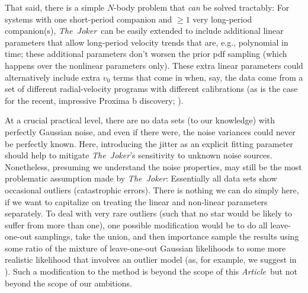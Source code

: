 \documentclass[manuscript, letterpaper]{aastex6}
\newcommand{\project}[1]{\textsl{#1}}
\newcommand{\samplername}{\project{The~Joker}}
\newcommand{\documentname}{\textsl{Article}}
\newcommand{\sectionname}{Section}
\newcommand{\resp}[1]{{\color{mahogany}#1}}
\begin{document}
That said, there is a simple $N$-body problem that \emph{can} be solved
tractably:
For systems with one short-period companion and $\geq1$ very long-period
companion(s), \samplername\ can be easily extended to include additional linear
parameters that allow long-period velocity trends that are, e.g., polynomial in
time; these additional parameters don't worsen the prior pdf sampling (which
happens over the nonlinear parameters only).
These extra linear parameters could alternatively include extra $v_0$ terms that
come in when, say, the data come from a set of different radial-velocity
programs with different calibrations (as is the case for the recent, impressive
Proxima b discovery; \citealt{Anglada-Escude:2016}).



At a crucial practical level, there are no data sets (to our knowledge) with
perfectly Gaussian noise, and even if there were, the noise variances
could never be perfectly known.
\resp{Here, introducing the jitter as an explicit fitting parameter should help
to mitigate \samplername's sensitivity to unknown noise sources.}
Nonetheless, presuming we understand the noise properties, may still be the most
problematic  assumption made by
\samplername :
Essentially all data sets show occasional outliers (catastrophic errors).
There is nothing we can do simply here, if we want to capitalize on treating the
linear and non-linear parameters separately.
To deal with very rare outliers (such that no star would be likely to suffer
from more than one), one possible modification would be to do all leave-one-out
samplings, take the union, and then importance sample the results using some
ratio of the mixture of leave-one-out Gaussian likelihoods to some more
realistic likelihood that involves an outlier model (as, for example, we suggest
in \citealt{Hogg:2010a}).
Such a modification to the method is beyond the scope of this
\documentname\, but not beyond the scope of our ambitions.
\end{document}

